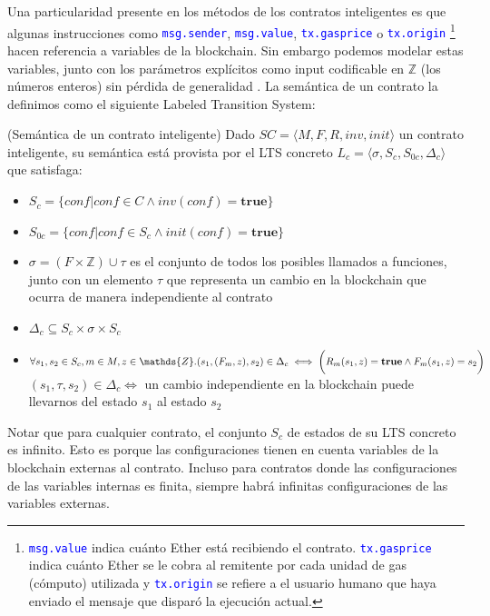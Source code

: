 Una particularidad presente en los métodos de los contratos inteligentes es que algunas instrucciones como \textcolor{blue}{\texttt{msg.sender}}, \textcolor{blue}{\texttt{msg.value}}, \textcolor{blue}{\texttt{tx.gasprice}} o \textcolor{blue}{\texttt{tx.origin}}
\footnote{\textcolor{blue}{\texttt{msg.value}} indica cuánto Ether está recibiendo el contrato. \textcolor{blue}{\texttt{tx.gasprice}} indica cuánto Ether se le cobra al remitente por cada unidad de gas (cómputo) utilizada y \textcolor{blue}{\texttt{tx.origin}} se refiere a el usuario humano que haya enviado el mensaje que disparó la ejecución actual.} hacen referencia a variables de la blockchain.
Sin embargo podemos modelar estas variables, junto con los parámetros explícitos como input codificable en $\mathds{Z}$ (los números enteros) sin pérdida de generalidad \cite{de-caso-epa}.
La semántica de un contrato la definimos como el siguiente Labeled Transition System:

\begin{definition}\label{definicion-lts}(Semántica de un contrato inteligente)
    Dado $SC = \langle M, F, R, inv, init \rangle$ un contrato inteligente, su semántica está provista por el LTS concreto $L_c = \langle \sigma , S_c, S_{0c}, \Delta _c \rangle$ que satisfaga:
    \begin{itemize}
        \item $S_c = \{conf | conf \in C \land inv(conf) = \textbf{true}\}$
        \item $S_{0c} = \{conf | conf \in S_c \land init(conf) = \textbf{true}\}$
        \item $\sigma = (F \times \mathds{Z}) \cup \tau$ es el conjunto de todos los posibles llamados a funciones, junto con un elemento $\tau$ que representa un cambio en la blockchain que ocurra de manera independiente al contrato
        \item $\Delta _c \subseteq S_c \times \sigma \times S_c$
        \item $\forall s_1,s_2 \in S_c, m \in M, z \in \mathds{Z} . \\ (s_1,(F_m,z),s_2) \in \Delta _c \iff \bigg( R_m(s_1,z) = \textbf{true} \land   F_m(s_1,z) = s_2 \bigg)$ \\
              $(s_1,\tau,s_2) \in \Delta _c \iff$ un cambio independiente en la blockchain puede llevarnos del estado $s_1$ al estado $s_2$
    \end{itemize}
\end{definition}
Notar que para cualquier contrato, el conjunto $S_c$ de estados de su LTS concreto es infinito.
Esto es porque las configuraciones tienen en cuenta variables de la blockchain externas al contrato.
Incluso para contratos donde las configuraciones de las variables internas es finita, siempre habrá infinitas configuraciones de las variables externas.
\\

